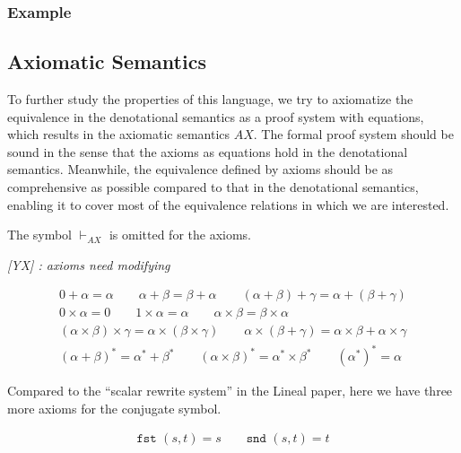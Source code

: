 \documentclass[manuscript, review, timestamp]{acmart}
\newcommand{\yx}[1]{\textit{\color{blue}[YX] : #1}}
\newcommand*{\fst}{\texttt{fst }}
\newcommand*{\snd}{\texttt{snd }}
\begin{document}
\subsubsection*{Example}



\subsection{Axiomatic Semantics}

To further study the properties of this language, we try to axiomatize the equivalence in the denotational semantics as a proof system with equations, which results in the axiomatic semantics $AX$. The formal proof system should be sound in the sense that the axioms as equations hold in the denotational semantics. Meanwhile, the equivalence defined by axioms should be as comprehensive as possible compared to that in the denotational semantics, enabling it to cover most of the equivalence relations in which we are interested.

The symbol $\vdash_{AX}$ is omitted for the axioms.

\yx{axioms need modifying}

\begin{definition}
  \begin{gather*}
    0 + \alpha = \alpha
    \qquad
    \alpha + \beta = \beta + \alpha
    \qquad
    (\alpha + \beta) + \gamma = \alpha + (\beta + \gamma) \\
    0 \times \alpha = 0
    \qquad
    1 \times \alpha = \alpha
    \qquad
    \alpha \times \beta = \beta \times \alpha \\
    (\alpha \times \beta) \times \gamma = \alpha \times (\beta \times \gamma) \qquad
    \alpha \times (\beta + \gamma) = \alpha \times \beta + \alpha \times \gamma \\
    (\alpha + \beta)^* = \alpha^* + \beta^*
    \qquad
    (\alpha \times \beta)^* = \alpha^* \times \beta^*
    \qquad
    (\alpha^*)^* = \alpha
  \end{gather*}
\end{definition}
Compared to the ``scalar rewrite system'' in the Lineal paper\cite{Arrighi2017}, here we have three more axioms for the conjugate symbol.


\begin{definition}[BASIS]
  \begin{gather*}
      \fst (s, t) = s
      \qquad
      \snd (s, t) = t
  \end{gather*}
\end{definition}
\end{document}
